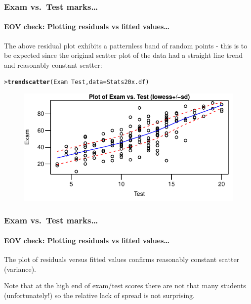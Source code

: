 \documentclass{beamer}\usepackage[]{graphicx}\usepackage[]{xcolor}
\makeatletter
\newcommand{\hlopt}[1]{\textcolor[rgb]{0,0,0}{#1}}%
\newcommand{\hlstd}[1]{\textcolor[rgb]{0.345,0.345,0.345}{#1}}%
\newcommand{\hlkwc}[1]{\textcolor[rgb]{0.333,0.667,0.333}{#1}}%
\newcommand{\hlkwd}[1]{\textcolor[rgb]{0.737,0.353,0.396}{\textbf{#1}}}%
\newenvironment{kframe}{%
 \def\at@end@of@kframe{}%
 \ifinner\ifhmode%
  \def\at@end@of@kframe{\end{minipage}}%
  \begin{minipage}{\columnwidth}%
 \fi\fi%
 \def\FrameCommand##1{\hskip\@totalleftmargin \hskip-\fboxsep
 \colorbox{shadecolor}{##1}\hskip-\fboxsep
     \hskip-\linewidth \hskip-\@totalleftmargin \hskip\columnwidth}%
 \MakeFramed {\advance\hsize-\width
   \@totalleftmargin\z@ \linewidth\hsize
   \@setminipage}}%
 {\par\unskip\endMakeFramed%
 \at@end@of@kframe}
\newenvironment{knitrout}{}{} %
\makeatother
\begin{document}
\begin{frame}[fragile]
\frametitle{Exam vs.\ Test marks\ldots}
\framesubtitle{EOV check: Plotting residuals vs fitted values\ldots}
The above residual plot exhibits a patternless band of random points - this is to be expected since
the original scatter plot of the data had a straight line trend and
reasonably constant scatter: 

\begin{knitrout}\scriptsize
{}\color{fgcolor}\begin{kframe}
\begin{alltt}
\hlstd{> }\hlkwd{trendscatter}\hlstd{(Exam}\hlopt{~}\hlstd{Test,} \hlkwc{data} \hlstd{=Stats20x.df)}
\end{alltt}
\end{kframe}
\end{knitrout}



\begin{figure}
  \centering
  \includegraphics{figure/RC-H02-011}
\end{figure}

\end{frame}



\begin{frame}[fragile]
\frametitle{Exam vs.\ Test marks\ldots}
\framesubtitle{EOV check: Plotting residuals vs fitted values\ldots}

The plot of residuals versus fitted values confirms reasonably constant scatter (variance). 

Note that at the high end of exam/test scores there are not that many students (unfortunately!) so the relative lack of spread is not surprising. 

\end{frame}
\end{document}
